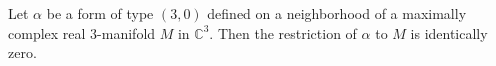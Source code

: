 
Let $\alpha$ be a form of type $(3,0)$ defined on a neighborhood of a maximally complex real $3$-manifold $M$ in $\mathbb{C}^3$. Then the restriction of $\alpha$ to $M$ is identically zero.
